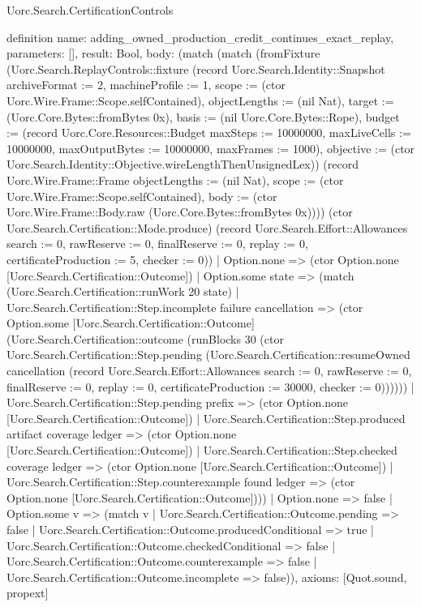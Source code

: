 \begin{lexlean}{Uorc.Search.CertificationControls}
\begin{semanticmodule}
definition{
  name: adding_owned_production_credit_continues_exact_replay,
  parameters: [],
  result: Bool,
  body: (match (match (fromFixture (Uorc.Search.ReplayControls::fixture (record Uorc.Search.Identity::Snapshot {archiveFormat := 2, machineProfile := 1, scope := (ctor Uorc.Wire.Frame::Scope.selfContained), objectLengths := (nil Nat), target := (Uorc.Core.Bytes::fromBytes 0x), basis := (nil Uorc.Core.Bytes::Rope), budget := (record Uorc.Core.Resources::Budget {maxSteps := 10000000, maxLiveCells := 10000000, maxOutputBytes := 10000000, maxFrames := 1000}), objective := (ctor Uorc.Search.Identity::Objective.wireLengthThenUnsignedLex)}) (record Uorc.Wire.Frame::Frame {objectLengths := (nil Nat), scope := (ctor Uorc.Wire.Frame::Scope.selfContained), body := (ctor Uorc.Wire.Frame::Body.raw (Uorc.Core.Bytes::fromBytes 0x))})) (ctor Uorc.Search.Certification::Mode.produce) (record Uorc.Search.Effort::Allowances {search := 0, rawReserve := 0, finalReserve := 0, replay := 0, certificateProduction := 5, checker := 0}))
      | Option.none => (ctor Option.none [Uorc.Search.Certification::Outcome])
      | Option.some state => (match (Uorc.Search.Certification::runWork 20 state)
        | Uorc.Search.Certification::Step.incomplete failure cancellation => (ctor Option.some [Uorc.Search.Certification::Outcome] (Uorc.Search.Certification::outcome (runBlocks 30 (ctor Uorc.Search.Certification::Step.pending (Uorc.Search.Certification::resumeOwned cancellation (record Uorc.Search.Effort::Allowances {search := 0, rawReserve := 0, finalReserve := 0, replay := 0, certificateProduction := 30000, checker := 0}))))))
        | Uorc.Search.Certification::Step.pending prefix => (ctor Option.none [Uorc.Search.Certification::Outcome])
        | Uorc.Search.Certification::Step.produced artifact coverage ledger => (ctor Option.none [Uorc.Search.Certification::Outcome])
        | Uorc.Search.Certification::Step.checked coverage ledger => (ctor Option.none [Uorc.Search.Certification::Outcome])
        | Uorc.Search.Certification::Step.counterexample found ledger => (ctor Option.none [Uorc.Search.Certification::Outcome])))
    | Option.none => false
    | Option.some v => (match v
      | Uorc.Search.Certification::Outcome.pending => false
      | Uorc.Search.Certification::Outcome.producedConditional => true
      | Uorc.Search.Certification::Outcome.checkedConditional => false
      | Uorc.Search.Certification::Outcome.counterexample => false
      | Uorc.Search.Certification::Outcome.incomplete => false)),
  axioms: [Quot.sound, propext]
}


\end{semanticmodule}
\end{lexlean}
